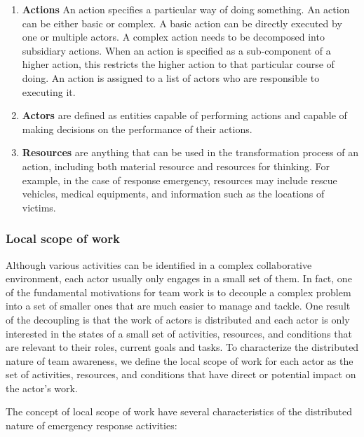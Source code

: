 \begin{enumerate}
	\item \textbf{Actions} An action specifies a particular way of doing something. An action can be either basic or complex. A basic action can be directly executed by one or multiple actors. A complex action needs to be decomposed into subsidiary actions. When an action is specified as a sub-component of a higher action, this restricts the higher action to that particular course of doing. An action is assigned to a list of actors who are responsible to executing it.
   \item \textbf{Actors} are defined as entities capable of performing actions and capable of making decisions on the performance of their actions.  
   \item \textbf{Resources} are anything that can be used in the transformation process of an action, including both material resource and resources for thinking. For example, in the case of response emergency, resources may include rescue vehicles, medical equipments, and information such as the locations of victims. 
\end{enumerate}

\subsubsection{Local scope of work} %
\label{ssub:local_scope_of_work}
Although various activities can be identified in a complex collaborative environment, each actor usually only engages in a small set of them. In fact, one of the fundamental motivations for team work is to decouple a complex problem into a set of smaller ones that are much easier to manage and tackle. One result of the decoupling is that the work of actors is distributed and each actor is only interested in the states of a small set of activities, resources, and conditions that are relevant to their roles, current goals and tasks. To characterize the distributed nature of team awareness, we define the local scope of work for each actor as the set of activities, resources, and conditions that have direct or potential impact on the actor’s work.

The concept of local scope of work have several characteristics of the distributed nature of emergency response activities:

